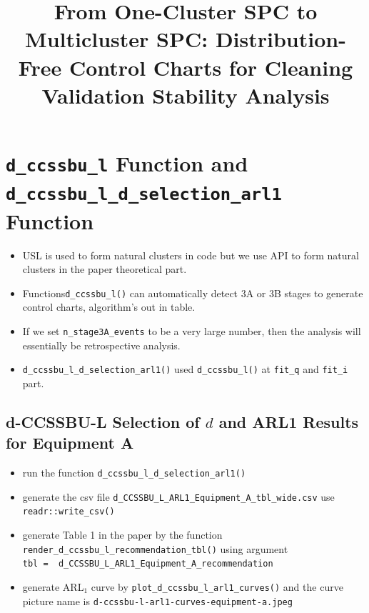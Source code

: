 \documentclass[
  11pt,
  letterpaper,
  DIV=11,
  numbers=noendperiod]{scrartcl}
\title{From One-Cluster SPC to Multicluster SPC: Distribution-Free
Control Charts for Cleaning Validation Stability Analysis}
\author{}
\date{}
\providecommand{\tightlist}{%
  \setlength{\itemsep}{0pt}\setlength{\parskip}{0pt}}
\begin{document}
\maketitle



\section{\texorpdfstring{\texttt{d\_ccssbu\_l} Function and
\texttt{d\_ccssbu\_l\_d\_selection\_arl1}
Function}{d\_ccssbu\_l Function and d\_ccssbu\_l\_d\_selection\_arl1 Function}}\label{d_ccssbu_l-function-and-d_ccssbu_l_d_selection_arl1-function}

\begin{itemize}
\tightlist
\item
  USL is used to form natural clusters in code but we use API to form
  natural clusters in the paper theoretical part.
\item
  Functions\texttt{d\_ccssbu\_l()} can automatically detect 3A or 3B
  stages to generate control charts, algorithm's out in table.
\item
  If we set \texttt{n\_stage3A\_events} to be a very large number, then
  the analysis will essentially be retrospective analysis.
\item
  \texttt{d\_ccssbu\_l\_d\_selection\_arl1()} used
  \texttt{d\_ccssbu\_l()} at \texttt{fit\_q} and \texttt{fit\_i} part.
\end{itemize}

\subsection{\texorpdfstring{d-CCSSBU-L Selection of \(d\) and ARL1
Results for Equipment
A}{d-CCSSBU-L Selection of d and ARL1 Results for Equipment A}}\label{d-ccssbu-l-selection-of-d-and-arl1-results-for-equipment-a}

\begin{itemize}
\tightlist
\item
  run the function \texttt{d\_ccssbu\_l\_d\_selection\_arl1()}
\item
  generate the csv file
  \texttt{d\_CCSSBU\_L\_ARL1\_Equipment\_A\_tbl\_wide.csv} use
  \texttt{readr::write\_csv()}
\item
  generate Table 1 in the paper by the function
  \texttt{render\_d\_ccssbu\_l\_recommendation\_tbl()} using argument
  \texttt{tbl\ =\ \ d\_CCSSBU\_L\_ARL1\_Equipment\_A\_recommendation}
\item
  generate ARL\(_1\) curve by
  \texttt{plot\_d\_ccssbu\_l\_arl1\_curves()} and the curve picture name
  is \texttt{d-ccssbu-l-arl1-curves-equipment-a.jpeg}
\end{itemize}
\end{document}

